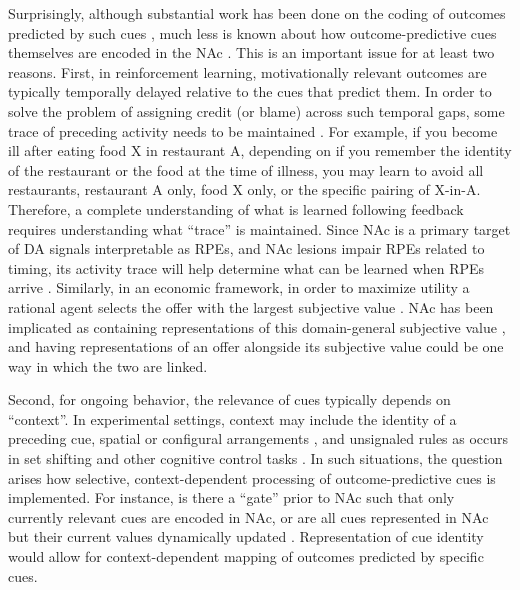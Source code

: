 \documentclass[11pt]{article}
\let\cite=\citep
\begin{document}
Surprisingly, although substantial work has been done on the coding of
outcomes predicted by such cues
\cite{Hollerman1998,Setlow2003,Nicola2004,Roitman2005,Day2006,Roesch2009a,Saddoris2011,Goldstein2012,Lansink2012,Bissonette2013,McGinty2013,Atallah2014,Sugam2014,Cooch2015,West2016},
much less is known about how outcome-predictive cues themselves are
encoded in the NAc \cite[but see;][]{Sleezer2016}. This is an important issue for
at least two reasons. First, in reinforcement learning, motivationally
relevant outcomes are typically temporally delayed relative to the
cues that predict them. In order to solve the problem of assigning
credit (or blame) across such temporal gaps, some trace of preceding
activity needs to be maintained \cite{sutton1998,Lee2012}. For
example, if you become ill after eating food X in restaurant A,
depending on if you remember the identity of the restaurant or the
food at the time of illness, you may learn to avoid all restaurants,
restaurant A only, food X only, or the specific pairing of
X-in-A. Therefore, a complete understanding of what is learned
following feedback requires understanding what “trace” is
maintained. Since NAc is a primary target of DA signals interpretable
as RPEs, and NAc lesions impair RPEs
related to timing, its activity trace will help determine what can be
learned when RPEs arrive
\cite{Ikemoto2007,McDannald2011,Hart2014,Hamid2016,Takahashi2016}. Similarly, in an economic framework, in order to maximize utility a rational agent selects the offer with the largest subjective value \cite{Samuelson1947}. NAc has been implicated as containing representations of this domain-general subjective value \cite{Peters2009,Levy2012,Bartra2013,Sescousse2015}, and having representations of an offer alongside its subjective value could be one way in which the two are linked.

Second, for ongoing behavior, the relevance of cues typically depends
on “context”. In experimental settings, context may include the
identity of a preceding cue, spatial or configural arrangements
\cite{Holland1992,Bouton1993,Honey2014}, and unsignaled rules as
occurs in set shifting and other cognitive control tasks
\cite{Grant1948,cohen1992context,Floresco2006a,Sleezer2016}. In such
situations, the question arises how selective, context-dependent
processing of outcome-predictive cues is implemented. For instance, is
there a “gate” prior to NAc such that only currently relevant cues are encoded in NAc, or are all cues represented in NAc but
their current values dynamically updated
\cite{Goto2008,Fitzgerald2014,Sleezer2016}. Representation of cue
identity would allow for context-dependent mapping of outcomes
predicted by specific cues.
\end{document}
